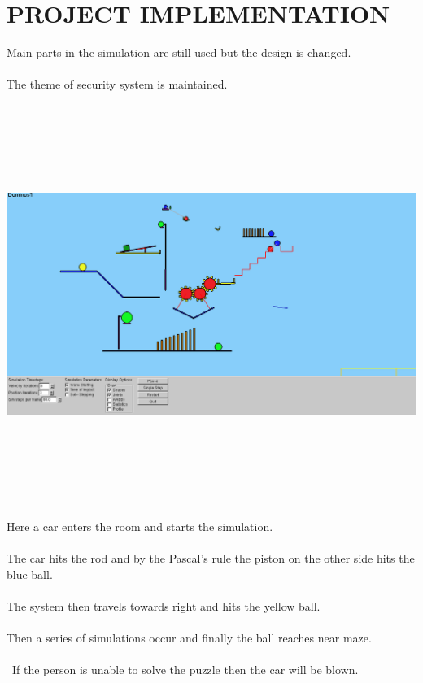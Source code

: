 \documentclass[a4paper, 11pt]{article}
\begin{document}
\clearpage


\section{\large{PROJECT IMPLEMENTATION}}
\large{
Main parts in the simulation are still used but the design is changed.\\ \\
The theme of security system is maintained. \\
\begin{center}
\includegraphics[height=13cm, scale=0.5]{img/middle.png}    %
\end{center}
Here a car enters the room and starts the simulation.\\\\
The car hits the rod and by the Pascal's rule the piston on the other side hits the blue ball.\\\\
The system then travels towards right and hits the yellow ball.\\ \\
Then a series of simulations occur and finally the ball reaches near maze.\\\\\
If the person is unable to solve the puzzle then the car will be blown. \\\\
}
\clearpage
\end{document}
